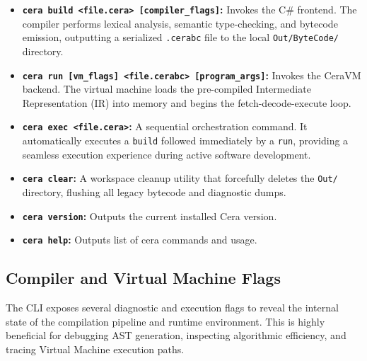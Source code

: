 \documentclass[11pt, a4paper]{article}
\begin{document}
\begin{itemize}
    \item \textbf{\texttt{cera build <file.cera> [compiler\_flags]}:} Invokes the C\# frontend. The compiler performs lexical analysis, semantic type-checking, and bytecode emission, outputting a serialized \texttt{.cerabc} file to the local \texttt{Out/ByteCode/} directory.
    \item \textbf{\texttt{cera run [vm\_flags] <file.cerabc> [program\_args]}:} Invokes the CeraVM backend. The virtual machine loads the pre-compiled Intermediate Representation (IR) into memory and begins the fetch-decode-execute loop.
    \item \textbf{\texttt{cera exec <file.cera>}:} A sequential orchestration command. It automatically executes a \texttt{build} followed immediately by a \texttt{run}, providing a seamless execution experience during active software development.
    \item \textbf{\texttt{cera clear}:} A workspace cleanup utility that forcefully deletes the \texttt{Out/} directory, flushing all legacy bytecode and diagnostic dumps.
    \item \textbf{\texttt{cera version}:} Outputs the current installed Cera version.
    \item \textbf{\texttt{cera help}:} Outputs list of cera commands and usage.
\end{itemize}

\subsection{Compiler and Virtual Machine Flags}
\noindent
The CLI exposes several diagnostic and execution flags to reveal the internal state of the compilation pipeline and runtime environment. This is highly beneficial for debugging AST generation, inspecting algorithmic efficiency, and tracing Virtual Machine execution paths.
\end{document}
